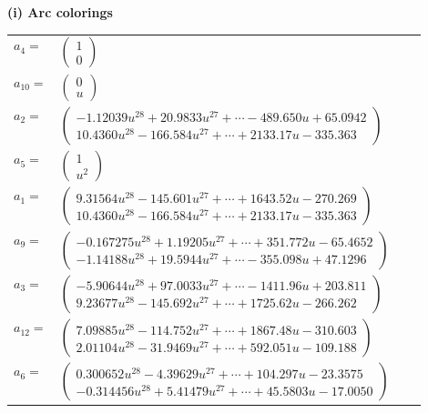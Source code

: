 \documentclass[1p]{elsarticle_modified}
\theoremstyle{definition}
\begin{document}
\flushleft \textbf{(i) Arc colorings}\\
\begin{tabular}{m{7pt} m{180pt} m{7pt} m{180pt} }
\flushright $a_{4}=$&$\begin{pmatrix}1\\0\end{pmatrix}$ \\
\flushright $a_{10}=$&$\begin{pmatrix}0\\u\end{pmatrix}$ \\
\flushright $a_{2}=$&$\begin{pmatrix}-1.12039 u^{28}+20.9833 u^{27}+\cdots-489.650 u+65.0942\\10.4360 u^{28}-166.584 u^{27}+\cdots+2133.17 u-335.363\end{pmatrix}$ \\
\flushright $a_{5}=$&$\begin{pmatrix}1\\u^2\end{pmatrix}$ \\
\flushright $a_{1}=$&$\begin{pmatrix}9.31564 u^{28}-145.601 u^{27}+\cdots+1643.52 u-270.269\\10.4360 u^{28}-166.584 u^{27}+\cdots+2133.17 u-335.363\end{pmatrix}$ \\
\flushright $a_{9}=$&$\begin{pmatrix}-0.167275 u^{28}+1.19205 u^{27}+\cdots+351.772 u-65.4652\\-1.14188 u^{28}+19.5944 u^{27}+\cdots-355.098 u+47.1296\end{pmatrix}$ \\
\flushright $a_{3}=$&$\begin{pmatrix}-5.90644 u^{28}+97.0033 u^{27}+\cdots-1411.96 u+203.811\\9.23677 u^{28}-145.692 u^{27}+\cdots+1725.62 u-266.262\end{pmatrix}$ \\
\flushright $a_{12}=$&$\begin{pmatrix}7.09885 u^{28}-114.752 u^{27}+\cdots+1867.48 u-310.603\\2.01104 u^{28}-31.9469 u^{27}+\cdots+592.051 u-109.188\end{pmatrix}$ \\
\flushright $a_{6}=$&$\begin{pmatrix}0.300652 u^{28}-4.39629 u^{27}+\cdots+104.297 u-23.3575\\-0.314456 u^{28}+5.41479 u^{27}+\cdots+45.5803 u-17.0050\end{pmatrix}$ \\

\end{tabular}
\end{document}
